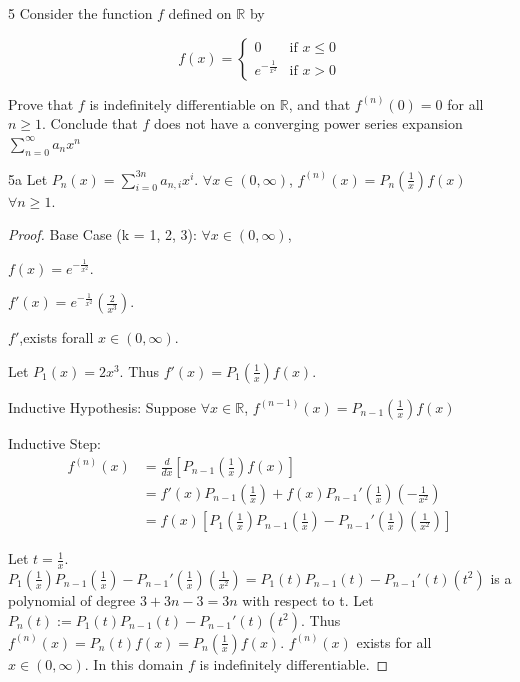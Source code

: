 \documentclass{article}
\newcommand{\R}{\mathbb{R}}
\begin{document}
\begin{PROB}{5}\label{Problem 5.}
    Consider the function $f$ defined on $\R$ by 
    
    \[f(x) = \begin{cases}
        0 & \text{if } x \leq 0 \\
        e^{-\frac{1}{x^2}} & \text{if } x > 0
    \end{cases}\]

    Prove that $f$ is indefinitely differentiable on $\R$, and that $f^{(n)}(0) = 0$ for all $n \geq 1$. Conclude that $f$ does not have a converging power series expansion $\sum_{n=0}^{\infty}a_n x^n$       
\end{PROB}
\begin{claim}{5a}\label{Claim 5a.}
    Let $P_n(x) = \sum_{i = 0}^{3n}a_{n, i}x^i$. $\forall x \in (0, \infty)$, $f^{(n)}(x) = P_{n}\left(\frac{1}{x}\right) f(x)$ $\forall n \geq 1$. 
\end{claim}
\begin{proof}
    Base Case (k = 1, 2, 3): $\forall x \in (0 , \infty)$, 
    
    $f(x) = e^{-\frac{1}{x^2}}$. 
    
    $f'(x) = e^{-\frac{1}{x^2}} \left(\frac{2}{x^3}\right)$.     
    
    $f'$,exists forall $x \in (0, \infty)$.

    Let $P_1(x) = 2x^3$.  Thus $f'(x) = P_1(\frac{1}{x})f(x)$.        
    
    Inductive Hypothesis: Suppose $\forall x \in \R$, $f^{(n - 1)}(x) = P_{n - 1}\left(\frac{1}{x}\right) f(x)$

    Inductive Step: \begin{align*}
        f^{(n)}(x) &= \frac{d}{dx}\left[ P_{n - 1}\left(\frac{1}{x}\right) f(x) \right] \\
        &= f'(x)P_{n - 1}\left(\frac{1}{x}\right) + f(x)P_{n - 1}'\left(\frac{1}{x}\right)\left(-\frac{1}{x^2}\right)\\
        &= f(x)\left[P_{1}\left(\frac{1}{x}\right)P_{n - 1}\left(\frac{1}{x}\right) - P_{n - 1}'\left(\frac{1}{x}\right)\left(\frac{1}{x^2}\right) \right]
    \end{align*}

    Let $t = \frac{1}{x}$. $P_{1}\left(\frac{1}{x}\right)P_{n - 1}\left(\frac{1}{x}\right) - P_{n - 1}'\left(\frac{1}{x}\right)\left(\frac{1}{x^2}\right) = P_{1}\left(t\right)P_{n - 1}\left(t\right) - P_{n - 1}'\left(t\right)\left(t^2\right)$ is a polynomial of degree $3 + 3n - 3 = 3n$ with respect to t. Let $P_n(t) := P_{1}\left(t\right)P_{n - 1}\left(t\right) - P_{n - 1}'\left(t\right)\left(t^2\right)$. Thus $f^{(n)}(x) = P_n(t) f(x) = P_n(\frac{1}{x})f(x)$. $f^{(n)}(x)$ exists for all $x \in (0, \infty)$. In this domain $f$ is indefinitely differentiable.  
\end{proof}
\end{document}
